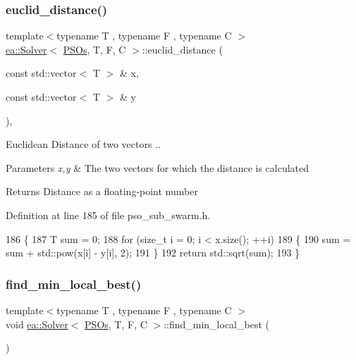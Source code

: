 \subsubsection{\texorpdfstring{euclid\+\_\+distance()}{euclid\_distance()}}
{\footnotesize\ttfamily template$<$typename T , typename F , typename C $>$ \\
\hyperlink{classea_1_1_solver}{ea\+::\+Solver}$<$ \hyperlink{structea_1_1_p_s_os}{P\+S\+Os}, T, F, C $>$\+::euclid\+\_\+distance (\begin{DoxyParamCaption}\item[{const std\+::vector$<$ T $>$ \&}]{x,  }\item[{const std\+::vector$<$ T $>$ \&}]{y }\end{DoxyParamCaption})\hspace{0.3cm}{\ttfamily [inline]}, {\ttfamily [private]}}



Euclidean Distance of two vectors .. 


\begin{DoxyParams}{Parameters}
{\em x,y} & The two vectors for which the distance is calculated \\
\hline
\end{DoxyParams}
\begin{DoxyReturn}{Returns}
Distance as a floating-\/point number 
\end{DoxyReturn}


Definition at line 185 of file pso\+\_\+sub\+\_\+swarm.\+h.


\begin{DoxyCode}
186         \{
187             T sum = 0;
188             \textcolor{keywordflow}{for} (\textcolor{keywordtype}{size\_t} i = 0; i < x.size(); ++i)
189             \{
190                 sum = sum + std::pow(x[i] - y[i], 2);
191             \}
192             \textcolor{keywordflow}{return} std::sqrt(sum);
193         \}
\end{DoxyCode}
\mbox{\label{classea_1_1_solver_3_01_p_s_os_00_01_t_00_01_f_00_01_c_01_4_a012b67607139916c790167fefc1f38e7}} 
\subsubsection{\texorpdfstring{find\+\_\+min\+\_\+local\+\_\+best()}{find\_min\_local\_best()}}
{\footnotesize\ttfamily template$<$typename T , typename F , typename C $>$ \\
void \hyperlink{classea_1_1_solver}{ea\+::\+Solver}$<$ \hyperlink{structea_1_1_p_s_os}{P\+S\+Os}, T, F, C $>$\+::find\+\_\+min\+\_\+local\+\_\+best (\begin{DoxyParamCaption}{ }\end{DoxyParamCaption})\hspace{0.3cm}{\ttfamily [private]}}



